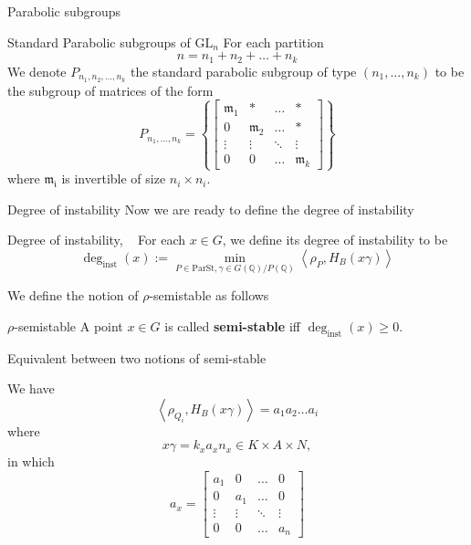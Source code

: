 \documentclass[pdf]{beamer}
\newcommand\Mycite[1]{%
  \citeauthor{#1}~}
\begin{document}
\begin{frame}{Parabolic subgroups}
    \pause\begin{block}{Standard Parabolic subgroups of $\text{GL}_n$}
        For each partition
        $$n = n_1+n_2+\ldots+n_k$$
        We denote $P_{n_1,n_2,\ldots,n_k}$ the standard parabolic subgroup of type $(n_1,\ldots, n_k)$ to be the subgroup of
        matrices of the form
        \[P_{n_1,\ldots, n_k} = \left\lbrace \begin{bmatrix}
                \mathfrak{m}_1 & \ast           & \ldots & \ast           \\
                0              & \mathfrak{m}_2 & \ldots & \ast           \\
                \vdots         & \vdots         & \ddots & \vdots         \\
                0              & 0              & \ldots & \mathfrak{m}_k
            \end{bmatrix} \right\rbrace\]
        where $\mathfrak{m_i}$ is invertible of size $n_i \times n_i$.
    \end{block}
\end{frame}
\begin{frame}{Degree of instability}
    Now we are ready to define the degree of instability
    \begin{block}{Degree of instability, \Mycite{chaudouard2016variante}}
        For each $x \in G$, we define its degree of instability to be
        \[\deg_{\text{inst}}(x):= \min_{P \in \text{ParSt}, \gamma \in G(\mathbb{Q})/P(\mathbb{Q})}\left\langle\rho_P, H_B(x\gamma) \right\rangle \]
    \end{block}\pause
    We define the notion of $\rho$-semistable as follows
    \begin{block}{$\rho$-semistable}
        A point $x \in G$ is called \textbf{semi-stable} iff $\deg_{\text{inst}}(x) \ge 0$.
    \end{block}
\end{frame}
\begin{frame}{Equivalent between two notions of semi-stable}

    We have
    \[\left\langle \rho_{Q_i}, H_B(x\gamma)   \right\rangle = a_1a_2\ldots a_i\]\pause
    where
    \[x\gamma = k_xa_xn_x \in K \times A \times N,\]
    in which
    \[a_x = \begin{bmatrix}
            a_1    & 0      & \ldots & 0      \\
            0      & a_1    & \ldots & 0      \\
            \vdots & \vdots & \ddots & \vdots \\
            0      & 0      & \ldots & a_n
        \end{bmatrix}\]
\end{frame}
\end{document}
